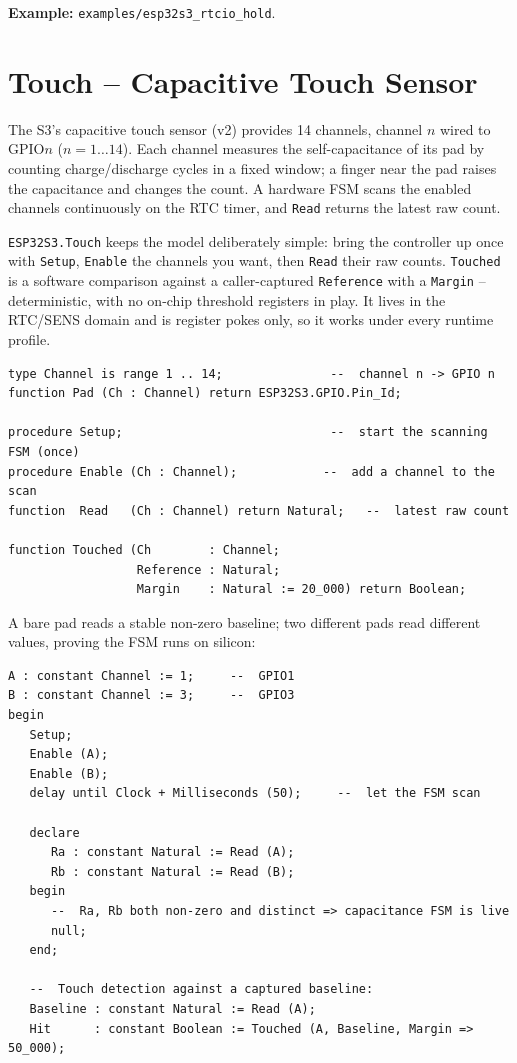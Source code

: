 \noindent\textbf{Example:} \texttt{examples/esp32s3\_rtcio\_hold}.

\section{Touch -- Capacitive Touch Sensor}
\label{app:int:touch}

The S3's capacitive touch sensor (v2) provides 14 channels, channel $n$ wired to
GPIO$n$ ($n = 1\ldots14$). Each channel measures the self-capacitance of its pad
by counting charge/discharge cycles in a fixed window; a finger near the pad
raises the capacitance and changes the count. A hardware FSM scans the enabled
channels continuously on the RTC timer, and \texttt{Read} returns the latest raw
count.

\texttt{ESP32S3.Touch} keeps the model deliberately simple: bring the controller
up once with \texttt{Setup}, \texttt{Enable} the channels you want, then
\texttt{Read} their raw counts. \texttt{Touched} is a software comparison against a
caller-captured \texttt{Reference} with a \texttt{Margin} -- deterministic, with
no on-chip threshold registers in play. It lives in the RTC/SENS domain and is
register pokes only, so it works under every runtime profile.

\begin{lstlisting}
type Channel is range 1 .. 14;               --  channel n -> GPIO n
function Pad (Ch : Channel) return ESP32S3.GPIO.Pin_Id;

procedure Setup;                             --  start the scanning FSM (once)
procedure Enable (Ch : Channel);            --  add a channel to the scan
function  Read   (Ch : Channel) return Natural;   --  latest raw count

function Touched (Ch        : Channel;
                  Reference : Natural;
                  Margin    : Natural := 20_000) return Boolean;
\end{lstlisting}

A bare pad reads a stable non-zero baseline; two different pads read different
values, proving the FSM runs on silicon:

\begin{lstlisting}
A : constant Channel := 1;     --  GPIO1
B : constant Channel := 3;     --  GPIO3
begin
   Setup;
   Enable (A);
   Enable (B);
   delay until Clock + Milliseconds (50);     --  let the FSM scan

   declare
      Ra : constant Natural := Read (A);
      Rb : constant Natural := Read (B);
   begin
      --  Ra, Rb both non-zero and distinct => capacitance FSM is live
      null;
   end;

   --  Touch detection against a captured baseline:
   Baseline : constant Natural := Read (A);
   Hit      : constant Boolean := Touched (A, Baseline, Margin => 50_000);
\end{lstlisting}

